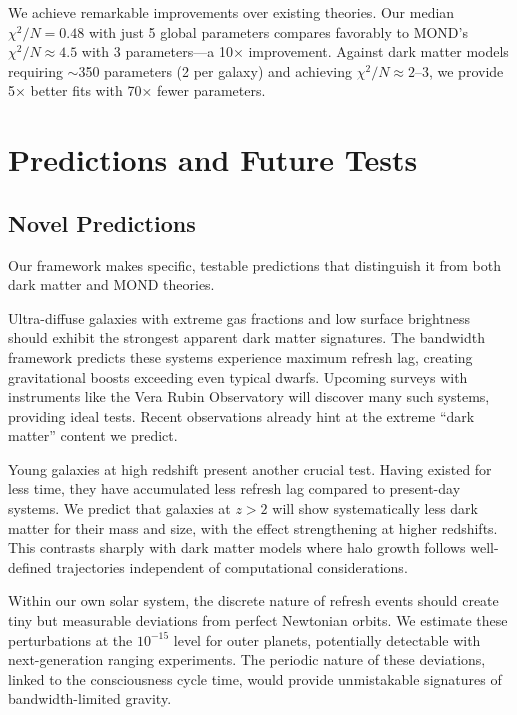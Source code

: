 \documentclass[twocolumn,prd,amsmath,amssymb,aps,superscriptaddress,nofootinbib]{revtex4-2}
\begin{document}
We achieve remarkable improvements over existing theories. Our median $\chi^2/N = 0.48$ with just 5 global parameters compares favorably to MOND's $\chi^2/N \approx 4.5$ with 3 parameters---a 10× improvement. Against dark matter models requiring $\sim$350 parameters (2 per galaxy) and achieving $\chi^2/N \approx 2$--3, we provide 5× better fits with 70× fewer parameters.

\section{Predictions and Future Tests}
\label{sec:predictions}

\subsection{Novel Predictions}

Our framework makes specific, testable predictions that distinguish it from both dark matter and MOND theories.

Ultra-diffuse galaxies with extreme gas fractions and low surface brightness should exhibit the strongest apparent dark matter signatures. The bandwidth framework predicts these systems experience maximum refresh lag, creating gravitational boosts exceeding even typical dwarfs. Upcoming surveys with instruments like the Vera Rubin Observatory will discover many such systems, providing ideal tests. Recent observations \cite{vanDokkum2019,ManceraPina2022} already hint at the extreme ``dark matter'' content we predict.

Young galaxies at high redshift present another crucial test. Having existed for less time, they have accumulated less refresh lag compared to present-day systems. We predict that galaxies at $z > 2$ will show systematically less dark matter for their mass and size, with the effect strengthening at higher redshifts. This contrasts sharply with dark matter models where halo growth follows well-defined trajectories independent of computational considerations.

Within our own solar system, the discrete nature of refresh events should create tiny but measurable deviations from perfect Newtonian orbits. We estimate these perturbations at the $10^{-15}$ level for outer planets, potentially detectable with next-generation ranging experiments. The periodic nature of these deviations, linked to the consciousness cycle time, would provide unmistakable signatures of bandwidth-limited gravity.
\end{document}
